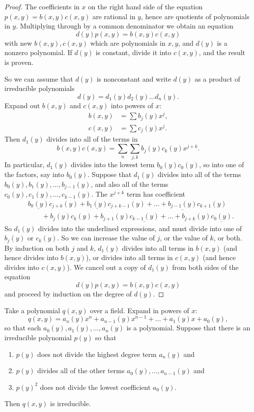 \begin{proof}
The coefficients in \(x\) on the right hand side of the equation
\(p(x,y) = b(x,y)c(x,y)\) are rational in \(y\), hence are quotients of polynomials in \(y\). Multiplying through by a common denominator we obtain an equation 
\[
d(y)p(x,y) = b(x,y)c(x,y)
\]
with new \(b(x,y), c(x,y)\) which are polynomials in \(x,y\), and \(d(y)\) is a nonzero polynomial. 
If \(d(y)\) is constant, divide it into \(c(x,y)\), and the result is proven.

So we can assume that \(d(y)\) is nonconstant and write \(d(y)\) as a product of irreducible polynomials
\[
d(y) = d_1(y)d_2(y) \dots d_n(y).
\]
Expand out \(b(x,y)\) and \(c(x,y)\) into powers of \(x\):
\begin{align*}
b(x,y) &= \sum b_j(y)x^j, \\
c(x,y) &= \sum c_j(y)x^j.
\end{align*}
Then \(d_1(y)\) divides into all of the terms in 
\[
b(x,y)c(x,y)= \sum_n \sum_{j,k} b_j(y)c_k(y) x^{j+k}.
\]
In particular, \(d_1(y)\) divides into the lowest term \(b_0(y)c_0(y)\), so into one of the factors, say into \(b_0(y)\).
Suppose that \(d_1(y)\) divides into all of the terms \(b_0(y), b_1(y), \dots, b_{j-1}(y)\), and also all of the terms \(c_0(y), c_1(y), \dots, c_{k-1}(y)\).
The \(x^{j+k}\) term has coefficient
\begin{align*}
& \underline{b_0(y)} c_{j+k}(y) + \underline{b_1(y)} c_{j+k-1}(y) + \dots + \underline{b_{j-1}(y)} c_{k+1}(y) \\
& \qquad + b_j(y) c_k(y) + b_{j+1}(y) \underline{c_{k-1}(y)} + \dots + b_{j+k}(y) \underline{c_0(y)}.
\end{align*}
So \(d_1(y)\) divides into the underlined expressions, and must divide into one of \(b_j(y)\) or \(c_k(y)\).
So we can increase the value of \(j\), or the value of \(k\), or both.
By induction on both \(j\) and \(k\), \(d_1(y)\) divides into all terms in \(b(x,y)\) (and hence divides into \(b(x,y)\)), or divides into all terms in \(c(x,y)\) (and hence divides into \(c(x,y)\)).
We cancel out a copy of \(d_1(y)\) from both sides of the equation
\[
d(y)p(x,y) = b(x,y)c(x,y)
\]
and proceed by induction on the degree of \(d(y)\).
\end{proof}
\begin{proposition}
Take a polynomial \(q(x,y)\) over a field.
Expand in powers of \(x\):
\[
q(x,y) = a_n(y) x^n + a_{n-1}(y) x^{n-1} + \dots + a_1(y) x + a_0(y),
\]
so that each \(a_0(y),a_1(y),\dots,a_n(y)\) is a polynomial.
Suppose that there is an irreducible polynomial \(p(y)\) so that
\begin{enumerate}
\item 
\(p(y)\) does not divide the highest degree term \(a_n(y)\) and
\item
\(p(y)\) divides all of the other terms \(a_0(y),\dots,a_{n-1}(y)\) and
\item
\(p(y)^2\) does not divide the lowest coefficient \(a_0(y)\).
\end{enumerate}
Then \(q(x,y)\) is irreducible.
\end{proposition}
